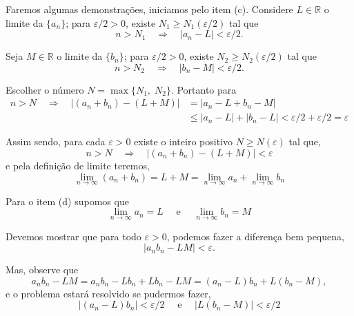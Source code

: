 \prova Faremos algumas demonstra\c{c}\~{o}es, iniciamos pelo item (c). Considere $L\in \mathbb{R}$ o limite da \seq $\{a_n\}$; para $\varepsilon/2>0$, existe $N_1\geq N_1(\varepsilon/2)$ tal que
\begin{equation*}
    n> N_1\quad \Rightarrow \quad |a_n-L|<\varepsilon/2.
\end{equation*}

Seja $M\in \mathbb{R}$ o limite da \seq $\{b_n\}$; para $\varepsilon/2>0$, existe  $N_2\geq N_2(\varepsilon/2)$ tal que
\begin{equation*}
    n>N_2\quad \Rightarrow \quad |b_n-M|<\varepsilon/2.
\end{equation*}

Escolher o n\'{u}mero $N=\max\{N_1,\; N_2\}$. Portanto para
\begin{align*}
    n>N\quad \Rightarrow\quad |(a_n+b_n)-(L+M)|&=|a_n-L+b_n-M|\\[2ex]
&\leq |a_n-L|+|b_n-L|<\varepsilon/2+\varepsilon/2=\varepsilon
\end{align*}

Assim sendo, para cada $\varepsilon>0$ existe o inteiro positivo $N\geq N(\varepsilon)$ tal que,
\begin{equation*}
    n>N\quad \Rightarrow \quad |(a_n+b_n)-(L+M)|<\varepsilon
\end{equation*}
e pela defini\c{c}\~{a}o de limite teremos,
\begin{equation*}
    \lim_{n\to \infty}(a_n+b_n)=L+M=\lim_{n\to \infty}a_n+\lim_{n\to \infty}b_n
\end{equation*}

Para o item (d) supomos que
\begin{equation*}
    \lim_{n\to \infty}a_n=L\quad \text{ e }\quad \lim_{n\to \infty}b_n=M
\end{equation*}

Devemos mostrar que para todo $\varepsilon>0$, podemos fazer a diferen\c{c}a bem pequena,
\begin{equation*}
    |a_nb_n-LM|<\varepsilon.
\end{equation*}

Mas, observe que
\begin{equation*}
    a_nb_n-LM=a_nb_n-Lb_n+Lb_n-LM=(a_n-L)b_n+L(b_n-M),
\end{equation*}
e o problema estará resolvido se pudermos fazer,
\begin{equation*}
    |(a_n-L)b_n|<\varepsilon/2\quad \text{ e }\quad |L(b_n-M)|<\varepsilon/2
\end{equation*}


